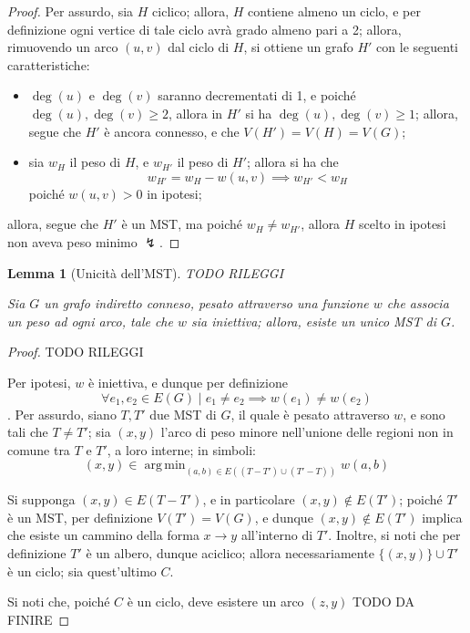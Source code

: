 \documentclass[14pt]{extreport}
\DeclareMathOperator*{\argmin}{arg\,min}
\newtheorem{lemma}{Lemma}[subsection]
\theoremstyle{definition}
\theoremstyle{definition}
\begin{document}
\begin{proof}
    Per assurdo, sia $H$ ciclico; allora, $H$ contiene almeno un ciclo, e per definizione ogni vertice di tale ciclo avrà grado almeno pari a 2; allora, rimuovendo un arco $(u, v)$ dal ciclo di $H$, si ottiene un grafo $H'$ con le seguenti caratteristiche:

    \begin{itemize}
        \item $\deg(u)$ e $\deg(v)$ saranno decrementati di 1, e poiché $\deg(u), \deg(v) \ge 2$, allora in $H'$ si ha $\deg(u), \deg(v) \ge 1$; allora, segue che $H'$ è ancora connesso, e che $V(H') = V(H) = V(G)$;
        \item sia $w_H$ il peso di $H$, e $w_{H'}$ il peso di $H'$; allora si ha che $$w_{H'} = w_H - w(u, v) \implies w_{H'} < w_H$$ poiché $w(u, v) > 0$ in ipotesi;
    \end{itemize}

    allora, segue che $H'$ è un MST, ma poiché $w_H \neq w_{H'}$, allora $H$ scelto in ipotesi non aveva peso minimo $\lightning$.
\end{proof}

\begin{lemma}[Unicità dell'MST]
    TODO RILEGGI

    Sia $G$ un grafo indiretto conneso, pesato attraverso una funzione $w$ che associa un peso ad ogni arco, tale che $w$ sia iniettiva; allora, esiste un unico MST di $G$.
\end{lemma}

\begin{proof}
    TODO RILEGGI

    Per ipotesi, $w$ è iniettiva, e dunque per definizione $$\forall e_1, e_2 \in E(G) \mid e_1 \neq e_2 \implies w(e_1) \neq w(e_2)$$. Per assurdo, siano $T, T'$ due MST di $G$, il quale è pesato attraverso $w$, e sono tali che $T \neq T'$; sia $(x, y)$ l'arco di peso minore nell'unione delle regioni non in comune tra $T$ e $T'$, a loro interne; in simboli: $$(x, y) \in \argmin_{(a, b) \in E((T - T') \cup (T' - T))}{w(a, b)}$$

    Si supponga $(x, y) \in E(T - T')$, e in particolare $(x, y) \notin E(T')$; poiché $T'$ è un MST, per definizione $V(T') = V(G)$, e dunque $(x, y) \notin E(T')$ implica che esiste un cammino della forma $x \rightarrow y$ all'interno di $T'$. Inoltre, si noti che per definizione $T'$ è un albero, dunque aciclico; allora necessariamente $\{(x, y)\} \cup T'$ è un ciclo; sia quest'ultimo $C$.

    Si noti che, poiché $C$ è un ciclo, deve esistere un arco $(z, y)$ TODO DA FINIRE
\end{proof}
\end{document}
